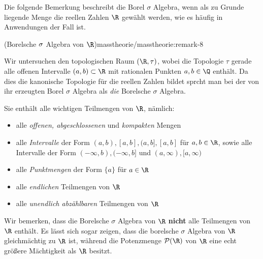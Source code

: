 \documentclass[letterpaper,10pt,english]{jupyterBook}
\begin{document}
\par
Die folgende Bemerkung beschreibt die Borel \(\sigma\) Algebra, wenn als zu Grunde liegende Menge die reellen Zahlen \(\R\) gewählt werden, wie es häufig in Anwendungen der Fall ist.
\begin{remark}{(Borelsche \protect\(\sigma\protect\) Algebra von \protect\(\R\protect\))}{masstheorie/masstheorie:remark-8}



\par
Wir untersuchen den topologischen Raum \((\R, \tau)\), wobei die Topologie \(\tau\) gerade alle offenen Intervalle \((a,b) \subset \R\) mit rationalen Punkten \(a,b \in \Q\) enthält.
Da dies die kanonische Topologie für die reellen Zahlen bildet sprcht man bei der von ihr erzeugten Borel \(\sigma\) Algebra als \emph{die} Borelsche \(\sigma\) Algebra.

\par
Sie enthält alle wichtigen Teilmengen von \(\R\), nämlich:
\begin{itemize}
\item {} 
\par
alle \emph{offenen, abgeschlossenen} und \emph{kompakten} Mengen

\item {} 
\par
alle \emph{Intervalle} der Form \((a,b), [a,b], (a,b], [a,b]\) für \(a,b \in \R\), sowie alle Intervalle der Form \((-\infty, b), (-\infty, b]\) und \((a, \infty), [a,\infty)\)

\item {} 
\par
alle \emph{Punktmengen} der Form \(\{a\}\) für \(a \in \R\)

\item {} 
\par
alle \emph{endlichen} Teilmengen von \(\R\)

\item {} 
\par
alle \emph{unendlich abzählbaren} Teilmengen von \(\R\)

\end{itemize}

\par
Wir bemerken, dass die Borelsche \(\sigma\) Algebra von \(\R\) \textbf{nicht} alle Teilmengen von \(\R\) enthält.
Es lässt sich sogar zeigen, dass die borelsche \(\sigma\) Algebra von \(\R\) gleichmächtig zu \(\R\) ist, während die Potenzmenge \(\mathcal{P}(\R)\) von \(\R\) eine echt größere Mächtigkeit als \(\R\) besitzt.
\end{remark}
\end{document}

